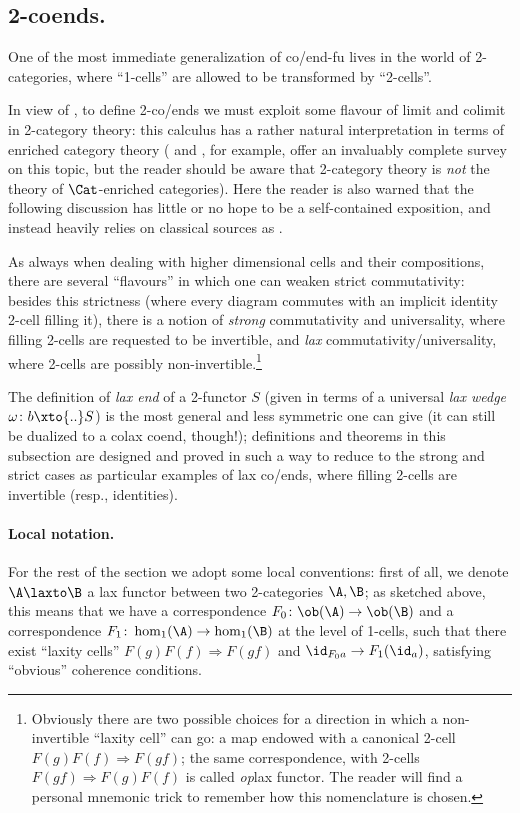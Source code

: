 \subsection{2-coends.}
One of the most immediate generalization of co/end-fu lives in the world of 2-categories, where ``1-cells'' are allowed to be transformed by ``2-cells''. 

In view of \aprop{}, to define 2-co/ends we must exploit some flavour of limit and colimit in 2-category theory: this calculus has a rather natural interpretation in terms of enriched category theory (\cite{kelly1974review} and \cite{2catlimits}, for example, offer an invaluably complete survey on this topic, but the reader should be aware that 2-category theory is \emph{not} the theory of $\Cat$-enriched categories). Here the reader is also warned that the following discussion has little or no hope to be a self-contained exposition, and instead heavily relies on classical sources as \cite{kelly1982basic,dubuc1970kan}.
\begin{notat}
As always when dealing with higher dimensional cells and their compositions, there are several ``flavours'' in which one can weaken strict commutativity: besides this strictness (where every diagram commutes with an implicit identity 2-cell filling it), there is a notion of \emph{strong} commutativity and universality, where filling 2-cells are requested to be invertible, and \emph{lax} commutativity/universality, where 2-cells are possibly non-invertible.\footnote{Obviously there are two possible choices for a direction in which a non-invertible ``laxity cell'' can go: a map endowed with a canonical 2-cell $F(g)F(f)\Rightarrow F(gf)$; the same correspondence, with 2-cells $F(gf)\Rightarrow F(g)F(f)$ is called \emph{op}lax functor. The reader will find a personal mnemonic trick to remember how this nomenclature is chosen.}
\end{notat}
The definition of \emph{lax end} of a 2-functor $S$ (given in terms of a universal \emph{lax wedge} $\omega\colon b\xto{..}S$) is the most general and less symmetric one can give (it can still be dualized to a colax coend, though!); definitions and theorems in this subsection are designed and proved in such a way to reduce to the strong and strict cases as particular examples of lax co/ends, where filling 2-cells are invertible (resp\@., identities).
\paragraph{\bf Local notation.} For the rest of the section we adopt some local conventions: first of all, we denote $\A\laxto \B$ a lax functor between two 2-categories $\A,\B$; as sketched above, this means that we have a correspondence $F_0\colon \ob(\A)\to \ob(\B)$ and a correspondence $F_1\colon \hom_1(\A)\to\hom_1(\B)$ at the level of 1-cells, such that there exist ``laxity cells'' $F(g)F(f)\Rightarrow F(gf)$ and $\id_{F_0a}\to F_1(\id_a)$, satisfying ``obvious'' coherence conditions. 

